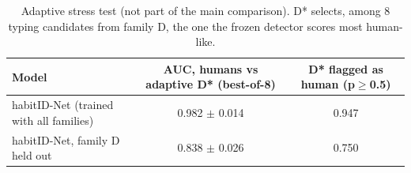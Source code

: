 \begin{table}[t]
\caption{Adaptive stress test (not part of the main comparison). D* selects, among 8 typing candidates from family D, the one the frozen detector scores most human-like.}
\label{tab:dstar}
\centering
\small
\begin{tabular}{lcc}
\toprule
Model & AUC, humans vs adaptive D* (best-of-8) & D* flagged as human (p$\geq$0.5) \\
\midrule
habitID-Net (trained with all families) & 0.982 $\pm$ 0.014 & 0.947 \\
habitID-Net, family D held out & 0.838 $\pm$ 0.026 & 0.750 \\
\bottomrule
\end{tabular}
\end{table}
